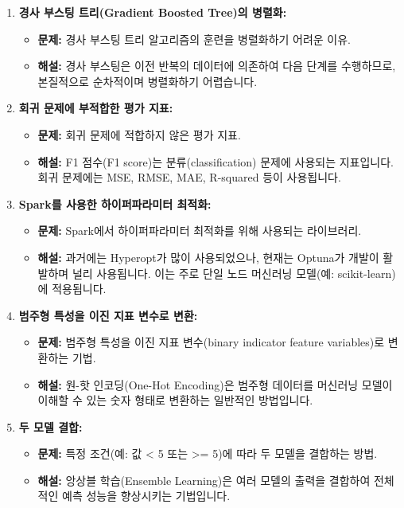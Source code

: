 \documentclass[11pt,a4paper]{article}
\theoremstyle{definition}
\begin{document}
\begin{enumerate}
    \item \textbf{경사 부스팅 트리(Gradient Boosted Tree)의 병렬화:}
    \begin{itemize}
        \item \textbf{문제:} 경사 부스팅 트리 알고리즘의 훈련을 병렬화하기 어려운 이유.
        \item \textbf{해설:} 경사 부스팅은 이전 반복의 데이터에 의존하여 다음 단계를 수행하므로, 본질적으로 순차적이며 병렬화하기 어렵습니다.
    \end{itemize}

    \item \textbf{회귀 문제에 부적합한 평가 지표:}
    \begin{itemize}
        \item \textbf{문제:} 회귀 문제에 적합하지 않은 평가 지표.
        \item \textbf{해설:} F1 점수(F1 score)는 분류(classification) 문제에 사용되는 지표입니다. 회귀 문제에는 MSE, RMSE, MAE, R-squared 등이 사용됩니다.
    \end{itemize}

    \item \textbf{Spark를 사용한 하이퍼파라미터 최적화:}
    \begin{itemize}
        \item \textbf{문제:} Spark에서 하이퍼파라미터 최적화를 위해 사용되는 라이브러리.
        \item \textbf{해설:} 과거에는 Hyperopt가 많이 사용되었으나, 현재는 Optuna가 개발이 활발하며 널리 사용됩니다. 이는 주로 단일 노드 머신러닝 모델(예: scikit-learn)에 적용됩니다.
    \end{itemize}

    \item \textbf{범주형 특성을 이진 지표 변수로 변환:}
    \begin{itemize}
        \item \textbf{문제:} 범주형 특성을 이진 지표 변수(binary indicator feature variables)로 변환하는 기법.
        \item \textbf{해설:} 원-핫 인코딩(One-Hot Encoding)은 범주형 데이터를 머신러닝 모델이 이해할 수 있는 숫자 형태로 변환하는 일반적인 방법입니다.
    \end{itemize}

    \item \textbf{두 모델 결합:}
    \begin{itemize}
        \item \textbf{문제:} 특정 조건(예: 값 < 5 또는 >= 5)에 따라 두 모델을 결합하는 방법.
        \item \textbf{해설:} 앙상블 학습(Ensemble Learning)은 여러 모델의 출력을 결합하여 전체적인 예측 성능을 향상시키는 기법입니다.
    \end{itemize}


\end{enumerate}
\end{document}
